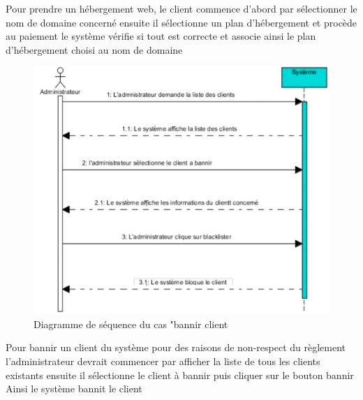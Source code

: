 \documentclass[a4paper, 12pt]{report}
\begin{document}
\noindent Pour prendre un hébergement web, le client commence d’abord par sélectionner le nom de domaine concerné ensuite il sélectionne un plan d’hébergement et procède au paiement le système vérifie si tout est correcte et associe ainsi le plan d’hébergement choisi au nom de domaine 
\begin{figure}[H]
	\centering
	\includegraphics{img/sequence/6}
	\caption{Diagramme de séquence du cas "bannir client}
	\label{Tux}
\end{figure}
\noindent Pour bannir un client du système pour des raisons de non-respect du règlement l’administrateur devrait commencer par afficher la liste de tous les clients existants ensuite il sélectionne le client à bannir puis cliquer sur le bouton bannir 
Ainsi le système bannit le client 
\end{document}
